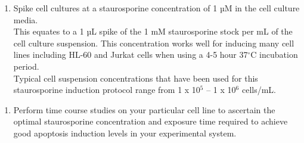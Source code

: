 \documentclass[10pt,letterpaper]{protocol}
\begin{document}
\divider

\begin{enumerate}[label=(\alph*)]
	\item Spike cell cultures at a staurosporine concentration of 1 µM in the cell culture media.\\
	This equates to a 1 µL spike of the 1 mM staurosporine stock per mL of the cell culture suspension.  This concentration works well for inducing many cell lines including HL-60 and Jurkat cells when using a 4-5 hour 37$^{\circ}$C incubation period.\\
	Typical cell suspension concentrations that have been used for this staurosporine induction protocol range from 1 x 10$^5$ – 1 x 10$^6$ cells/mL. 
\end{enumerate}

\divider

\begin{enumerate}[label=(\alph*)]
	\item Perform time course studies on your particular cell line to ascertain the optimal staurosporine concentration and exposure time required to achieve good apoptosis induction levels in your experimental system.
\end{enumerate}

\divider

\end{document}
